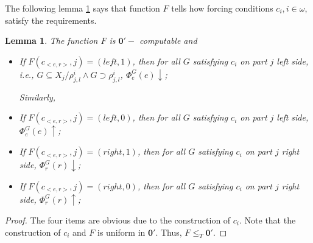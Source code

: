 \documentclass[options]{amsart}
\newtheorem{lemma}[theorem]{Lemma}
\theoremstyle{definition}
\theoremstyle{remark}
\newtheorem{Ramsey's theorem}[theorem]{Ramsey's theorem}
\begin{document}
The following lemma \ref{RT21lem1}
says that function $F$ tells
how forcing conditions $c_i,i\in\omega$,
satisfy
the requirements.
\begin{lemma}\label{RT21lem1}
The function $F$ is $\mathbf{0}'-$
computable and
\begin{itemize}
\item
If $F(c_{<e,r>}, j) = (left, 1)$,
then for all $G$ satisfying
$c_i$ on part $j$ left side,
i.e., $G\subseteq X_j/\rho^i_{j,l}\wedge
G\supset\rho^i_{j,l}$,
$\Phi_e^G(e)\downarrow$;

Similarly,
\item
If $F(c_{<e,r>}, j) = (left, 0)$,
then for all $G$ satisfying
$c_i$ on part $j$ left side,
$\Phi_e^G(e)\uparrow$;

\item
If $F(c_{<e,r>}, j) = (right, 1)$,
then for all $G$ satisfying
$c_i$ on part $j$ right side,
$\Phi_r^G(r)\downarrow$;
\item
If $F(c_{<e,r>}, j) = (right, 0)$,
then for all $G$ satisfying
$c_i$ on part $j$ right side,
$\Phi_r^G(r)\uparrow$;

\end{itemize}

\end{lemma}

\begin{proof}
The four items are
obvious due to the construction
of $c_{i}$.
Note that the construction
of $c_i$
 and $F$ is uniform in $\mathbf{0}'$.
 Thus, $F\leq_T \mathbf{0}'$.
\end{proof}
\end{document}
